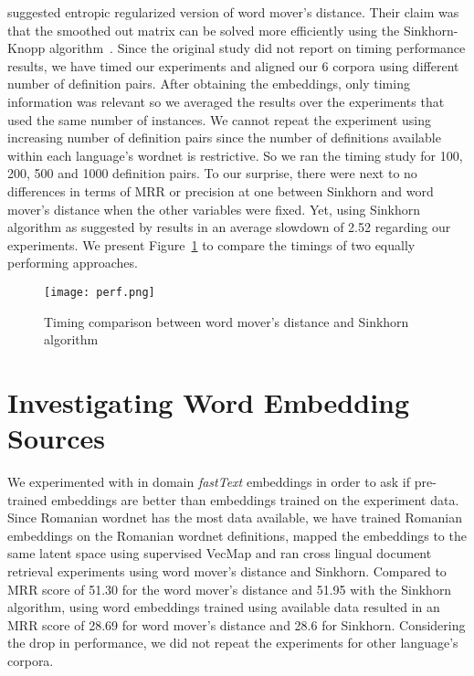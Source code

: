 \textcite{balikas_cross-lingual_2018} suggested entropic regularized version of word mover's distance.
Their claim was that the smoothed out matrix can be solved more efficiently using the Sinkhorn-Knopp algorithm~\cite{sinkhorn_concerning_1967}.
Since the original study did not report on timing performance results, we have timed our experiments and aligned our 6 corpora using different number of definition pairs.
After obtaining the embeddings, only timing information was relevant so we averaged the results over the experiments that used the same number of instances.
We cannot repeat the experiment using increasing number of definition pairs since the number of definitions available within each language's wordnet is restrictive.
So we ran the timing study for 100, 200, 500 and 1000 definition pairs.
To our surprise, there were next to no differences in terms of MRR or precision at one between Sinkhorn and word mover's distance when the other variables were fixed.
Yet, using Sinkhorn algorithm as suggested by \citeauthor{balikas_cross-lingual_2018} results in an average slowdown of 2.52 regarding our experiments.
We present Figure~\ref{fig:perf} to compare the timings of two equally performing approaches.

\begin{figure}[htpb]
    \centering
    \texttt{[image: perf.png]}
    \caption{Timing comparison between word mover's distance and Sinkhorn algorithm}%
    \label{fig:perf}
\end{figure}

\section{Investigating Word Embedding Sources}%
\label{sec:investigating_word_embedding_sources}

We experimented with in domain \emph{fastText} embeddings in order to ask if pre-trained embeddings are better than embeddings trained on the experiment data.
Since Romanian wordnet has the most data available, we have trained Romanian embeddings on the Romanian wordnet definitions, mapped the embeddings to the same latent space using supervised VecMap and ran cross lingual document retrieval experiments using word mover's distance and Sinkhorn.
Compared to MRR score of 51.30 for the word mover's distance and 51.95 with the Sinkhorn algorithm, using word embeddings trained using available data resulted in an MRR score of 28.69 for word mover's distance and 28.6 for Sinkhorn.
Considering the drop in performance, we did not repeat the experiments for other language's corpora.

